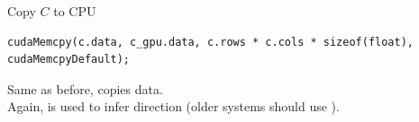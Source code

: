 \begin{frame}[fragile]{Copy $C$ to CPU}
    \begin{verbatim}
cudaMemcpy(c.data, c_gpu.data, c.rows * c.cols * sizeof(float), cudaMemcpyDefault);
    \end{verbatim}

    Same as before,  copies data. \\
    Again,  is used to infer direction (older systems should use ).

\end{frame}


